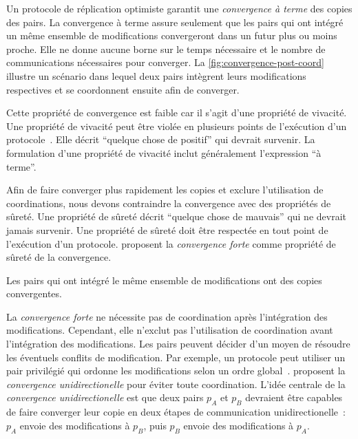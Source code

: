 Un protocole de réplication optimiste garantit une \emph{convergence à terme} des copies des pairs.
La convergence à terme assure seulement que les pairs qui ont intégré un même ensemble de modifications convergeront dans un futur plus ou moins proche.
Elle ne donne aucune borne sur le temps nécessaire et le nombre de communications nécessaires  pour converger.
La \autoref{fig:convergence-post-coord} illustre un scénario dans lequel deux pairs intègrent leurs modifications respectives et se coordonnent ensuite afin de converger.

Cette propriété de convergence est faible car il s'agit d'une propriété de vivacité.
Une propriété de vivacité peut être violée en plusieurs points de l'exécution d'un protocole~\autocite{alpern_liveness_1985}.
Elle décrit \enquote{quelque chose de positif} qui devrait survenir.
La formulation d'une propriété de vivacité inclut généralement l'expression \enquote{à terme}.

Afin de faire converger plus rapidement les copies et exclure l'utilisation de coordinations, nous devons contraindre la convergence avec des propriétés de sûreté.
Une propriété de sûreté décrit \enquote{quelque chose de mauvais} qui ne devrait jamais survenir.
Une propriété de sûreté doit être respectée en tout point de l'exécution d'un protocole.
\textcite{shapiro_2011_crdt} proposent la \emph{convergence forte} comme propriété de sûreté de la convergence.

\begin{definition}\label{def:strong-convergence}
Les pairs qui ont intégré le même ensemble de modifications ont des copies convergentes.
\end{definition}

La \emph{convergence forte} ne nécessite pas de coordination après l'intégration des modifications.
Cependant, elle n'exclut pas l'utilisation de coordination avant l'intégration des modifications.
Les pairs peuvent décider d'un moyen de résoudre les éventuels conflits de modification.
Par exemple, un protocole peut utiliser un pair privilégié qui ordonne les modifications selon un ordre global~\autocite{terry_bayou_1995}.
\textcite{mahajan_2011_cac} proposent la \emph{convergence unidirectionelle} pour éviter toute coordination.
L'idée centrale de la \emph{convergence unidirectionelle} est que deux pairs $p_A$ et $p_B$ devraient être capables de faire converger leur copie en deux étapes de communication unidirectionelle~: $p_A$ envoie des modifications à $p_B$, puis $p_B$ envoie des modifications à $p_A$.

